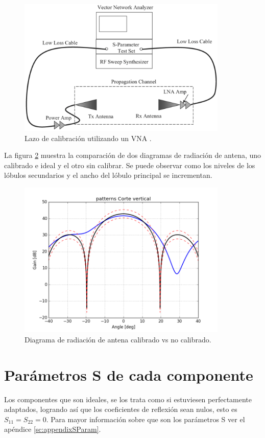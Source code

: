 \begin{figure}[H]
 \centering
 \includegraphics[width=10cm]{gfx/calibrationLoop.png}
 \caption{Lazo de calibración utilizando un VNA \cite{Reed2012}.}
 \label{fig:calibrationLoop}
\end{figure}

La figura \ref{fig:nonCalPattern} muestra la comparación de dos diagramas de radiación de antena, uno calibrado e ideal y el
otro sin calibrar. Se puede observar como los niveles de los lóbulos secundarios y el ancho del lóbulo principal se incrementan.

\begin{figure}[H]
 \centering
 \includegraphics[width=10cm]{gfx/nonCalPattern.png}
 \caption{Diagrama de radiación de antena calibrado vs no calibrado.}
 \label{fig:nonCalPattern}
\end{figure}

\section{Parámetros S de cada componente}

Los componentes que son ideales, se los trata como si estuviesen perfectamente adaptados, logrando así que los coeficientes
de reflexión sean nulos, esto es $S_{11} = S_{22} = 0$. Para mayor información sobre que son los parámetros S ver el apéndice
\ref{sc:appendixSParam}.


